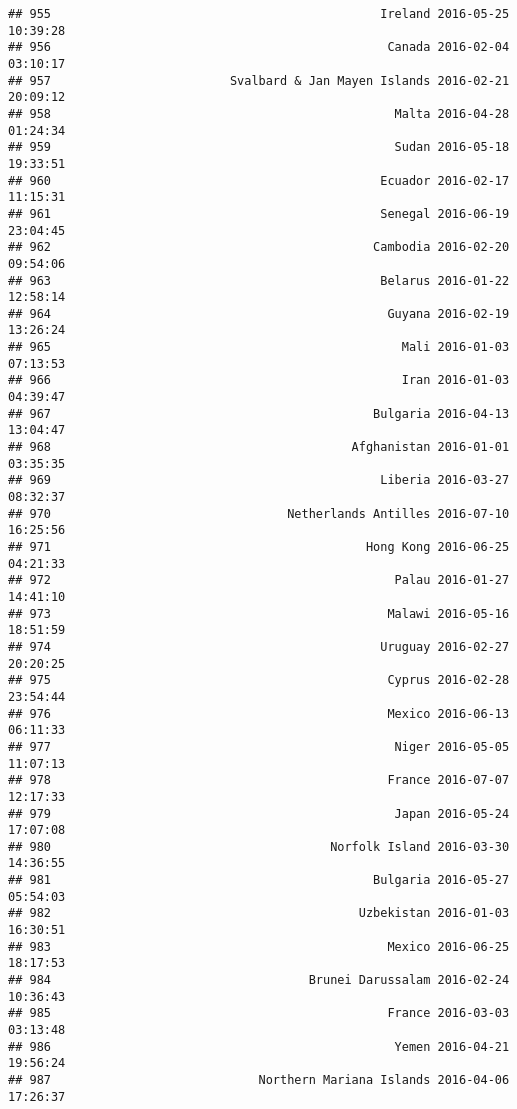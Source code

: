 \documentclass[
]{article}
\begin{document}
\begin{verbatim}
## 955                                              Ireland 2016-05-25 10:39:28
## 956                                               Canada 2016-02-04 03:10:17
## 957                         Svalbard & Jan Mayen Islands 2016-02-21 20:09:12
## 958                                                Malta 2016-04-28 01:24:34
## 959                                                Sudan 2016-05-18 19:33:51
## 960                                              Ecuador 2016-02-17 11:15:31
## 961                                              Senegal 2016-06-19 23:04:45
## 962                                             Cambodia 2016-02-20 09:54:06
## 963                                              Belarus 2016-01-22 12:58:14
## 964                                               Guyana 2016-02-19 13:26:24
## 965                                                 Mali 2016-01-03 07:13:53
## 966                                                 Iran 2016-01-03 04:39:47
## 967                                             Bulgaria 2016-04-13 13:04:47
## 968                                          Afghanistan 2016-01-01 03:35:35
## 969                                              Liberia 2016-03-27 08:32:37
## 970                                 Netherlands Antilles 2016-07-10 16:25:56
## 971                                            Hong Kong 2016-06-25 04:21:33
## 972                                                Palau 2016-01-27 14:41:10
## 973                                               Malawi 2016-05-16 18:51:59
## 974                                              Uruguay 2016-02-27 20:20:25
## 975                                               Cyprus 2016-02-28 23:54:44
## 976                                               Mexico 2016-06-13 06:11:33
## 977                                                Niger 2016-05-05 11:07:13
## 978                                               France 2016-07-07 12:17:33
## 979                                                Japan 2016-05-24 17:07:08
## 980                                       Norfolk Island 2016-03-30 14:36:55
## 981                                             Bulgaria 2016-05-27 05:54:03
## 982                                           Uzbekistan 2016-01-03 16:30:51
## 983                                               Mexico 2016-06-25 18:17:53
## 984                                    Brunei Darussalam 2016-02-24 10:36:43
## 985                                               France 2016-03-03 03:13:48
## 986                                                Yemen 2016-04-21 19:56:24
## 987                             Northern Mariana Islands 2016-04-06 17:26:37

\end{verbatim}
\end{document}
